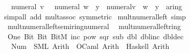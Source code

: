 \begin{isabellebody}
\ \ {\isachardoublequoteopen}{\isacharminus}{\kern0pt}\ numeral\ v\ {\isacharasterisk}{\kern0pt}\ {\isacharparenleft}{\kern0pt}{\isacharminus}{\kern0pt}\ numeral\ w\ {\isacharasterisk}{\kern0pt}\ y{\isacharparenright}{\kern0pt}\ {\isacharequal}{\kern0pt}\ {\isacharparenleft}{\kern0pt}numeral{\isacharparenleft}{\kern0pt}v\ {\isacharasterisk}{\kern0pt}\ w{\isacharparenright}{\kern0pt}\ {\isacharasterisk}{\kern0pt}\ y\ {\isacharcolon}{\kern0pt}{\isacharcolon}{\kern0pt}\ {\isacharprime}{\kern0pt}a{\isacharcolon}{\kern0pt}{\isacharcolon}{\kern0pt}ring{\isacharunderscore}{\kern0pt}{}{\isacharparenright}{\kern0pt}{\isachardoublequoteclose}\isanewline
%
\isadelimproof
\ \ %
\endisadelimproof
%
\isatagproof
{}\isamarkupfalse%
\ {\isacharparenleft}{\kern0pt}simp{\isacharunderscore}{\kern0pt}all\ add{\isacharcolon}{\kern0pt}\ mult{\isachardot}{\kern0pt}assoc\ {\isacharbrackleft}{\kern0pt}symmetric{\isacharbrackright}{\kern0pt}{\isacharparenright}{\kern0pt}%
\endisatagproof
{\isafoldproof}%
%
\isadelimproof
\isanewline
%
\endisadelimproof
\isanewline
{}\isamarkupfalse%
\ mult{\isacharunderscore}{\kern0pt}numeral{\isacharunderscore}{\kern0pt}left\ {\isacharbrackleft}{\kern0pt}simp{\isacharbrackright}{\kern0pt}\ {\isacharequal}{\kern0pt}\isanewline
\ \ mult{\isacharunderscore}{\kern0pt}numeral{\isacharunderscore}{\kern0pt}left{\isacharunderscore}{\kern0pt}semiring{\isacharunderscore}{\kern0pt}numeral\isanewline
\ \ mult{\isacharunderscore}{\kern0pt}numeral{\isacharunderscore}{\kern0pt}left{\isacharunderscore}{\kern0pt}ring{\isacharunderscore}{\kern0pt}{}\isanewline
\isanewline
{}\isamarkupfalse%
\ {\isacharparenleft}{\kern0pt}\ One\ Bit{}\ Bit{}\ BitM\ inc\ pow\ sqr\ sub\ dbl\ dbl{\isacharunderscore}{\kern0pt}inc\ dbl{\isacharunderscore}{\kern0pt}dec%
\isadelimdocument
%
\endisadelimdocument
%
\isatagdocument
%
\isamarkuptrue%
%
\endisatagdocument
{\isafolddocument}%
%
\isadelimdocument
%
\endisadelimdocument
{}\isamarkupfalse%
\isanewline
\ \ \ Num\ {\isasymrightharpoonup}\ {\isacharparenleft}{\kern0pt}SML{\isacharparenright}{\kern0pt}\ Arith\ \ {\isacharparenleft}{\kern0pt}OCaml{\isacharparenright}{\kern0pt}\ Arith\ \ {\isacharparenleft}{\kern0pt}Haskell{\isacharparenright}{\kern0pt}\ Arith%
\isadelimdocument
%

\end{isabellebody}
